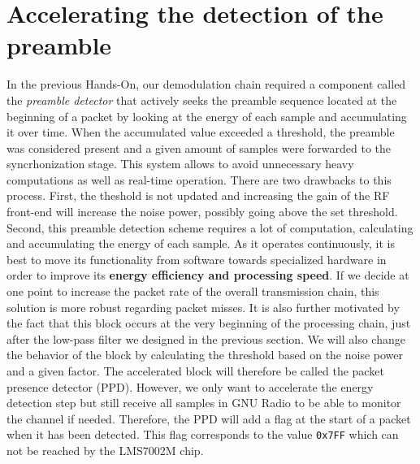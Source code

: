 \section{Accelerating the detection of the preamble}
In the previous Hands-On, our demodulation chain required a component called the \textit{preamble detector} that actively seeks the preamble sequence located at the beginning of a packet by looking at the energy of each sample and accumulating it over time. When the accumulated value exceeded a threshold, the preamble was considered present and a given amount of samples were forwarded to the syncrhonization stage. This system allows to avoid unnecessary heavy computations as well as real-time operation. There are two drawbacks to this process. First, the theshold is not updated and increasing the gain of the RF front-end will increase the noise power, possibly going above the set threshold. Second, this preamble detection scheme requires a lot of computation, calculating and accumulating the energy of each sample. As it operates continuously, it is best to move its functionality from software towards specialized hardware in order to improve its \textbf{energy efficiency and processing speed}. If we decide at one point to increase the packet rate of the overall transmission chain, this solution is more robust regarding packet misses. It is also further motivated by the fact that this block occurs at the very beginning of the processing chain, just after the low-pass filter we designed in the previous section. We will also change the behavior of the block by calculating the threshold based on the noise power and a given factor. The accelerated block will therefore be called the packet presence detector (PPD). However, we only want to accelerate the energy detection step but still receive all samples in GNU Radio to be able to monitor the channel if needed. Therefore, the PPD will add a flag at the start of a packet when it has been detected. This flag corresponds to the value \texttt{0x7FF} which can not be reached by the LMS7002M chip.


